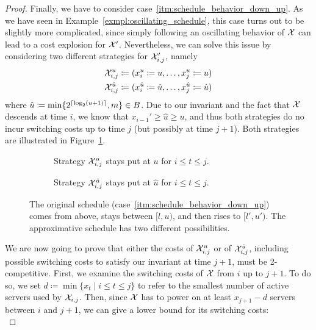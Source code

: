 \begin{proof}
Finally, we have to consider case~\ref{itm:schedule_behavior_down_up}. As we have seen in Example~\ref{exmpl:oscillating_schedule}, this case turns out to be slightly more complicated, since simply following an oscillating behavior of $\mathcal{X}$ can lead to a cost explosion for $\mathcal{X}'$. Nevertheless, we can solve this issue by considering two different strategies for $\mathcal{X}_{i,j}'$, namely
\begin{align*}
	\mathcal{X}_{i,j}^u&\coloneqq(x_i^u\coloneqq u,\dotsc,x_j^u\coloneqq u)\\
	\mathcal{X}_{i,j}^{\hat{u}}&\coloneqq(x_i^{\hat{u}}\coloneqq\hat{u},\dotsc,x_j^{\hat{u}}\coloneqq\hat{u})
\end{align*}
where $\hat{u}\coloneqq\min\{2^{\lceil\log_2(u+1)\rceil},m\}\in B$. Due to our invariant and the fact that $\mathcal{X}$ descends at time $i$, we know that $x_{i-1}'\ge \hat{u}\ge u$, and thus both strategies do no incur switching costs up to time $j$ (but possibly at time $j+1$). Both strategies are illustrated in Figure~\ref{fig:schedule_behavior_down_up}.
\begin{figure}[H]
\captionsetup[subfigure]{labelformat=empty}
\begin{subfigure}[b]{0.48\textwidth}

\caption{Strategy $\mathcal{X}_{i,j}^u$ stays put at $u$ for $i\le t\le j$.}
\end{subfigure}
\hfill
\begin{subfigure}[b]{0.48\textwidth}

\caption{Strategy $\mathcal{X}_{i,j}^{\hat{u}}$ stays put at $\hat{u}$ for $i\le t\le j$.}
\end{subfigure}
\caption{The original schedule (case~\ref{itm:schedule_behavior_down_up}) comes from above, stays between $[l,u)$, and then rises to $[l',u')$. The approximative schedule has two different possibilities.}
\label{fig:schedule_behavior_down_up}
\end{figure}
We are now going to prove that either the costs of $\mathcal{X}_{i,j}^u$ or of $\mathcal{X}_{i,j}^{\hat{u}}$, including possible switching costs to satisfy our invariant at time $j+1$, must be 2-competitive. 
First, we examine the switching costs of $\mathcal{X}$ from $i$ up to $j+1$. To do so, we set $d\coloneqq\min\{x_t\mid i\le t\le j\}$ to refer to the smallest number of active servers used by $\mathcal{X}_{i,j}$. Then, since $\mathcal{X}$ has to power on at least $x_{j+1}-d$ servers between $i$ and $j+1$, we can give a lower bound for its switching costs:
\begin{equation*}

\end{equation*}
\end{proof}
